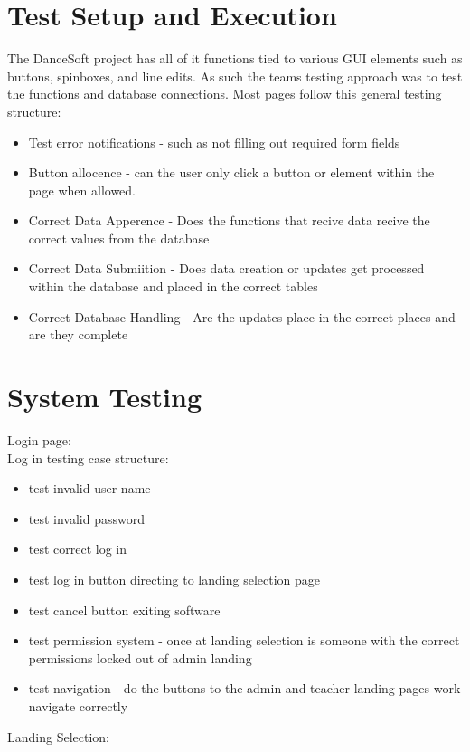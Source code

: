 \section{Test Setup and Execution}
The DanceSoft project has all of it functions tied to various GUI elements such as buttons, spinboxes, and line edits. As such the teams testing approach was to test the functions and database connections. Most pages follow this general testing structure:

\begin{itemize}
\item Test error notifications - such as not filling out required form fields
\item Button allocence - can the user only click a button or element within the page when allowed.
\item Correct Data Apperence - Does the functions that recive data recive the correct values from the database
\item Correct Data Submiition - Does data creation or updates get processed within the database and placed in the correct tables
\item Correct Database Handling - Are the updates place in the correct places and are they complete
\end{itemize}


\section{System Testing}

Login page:\\

Log in testing case structure:
\begin{itemize}
\item test invalid user name
\item test invalid password
\item test correct log in 
\item test log in button directing to landing selection page
\item test cancel button exiting software
\item test permission system - once at landing selection is someone with the correct permissions locked out of admin landing
\item test navigation - do the buttons to the admin and teacher landing pages work navigate correctly
\end{itemize}

Landing Selection:\\

